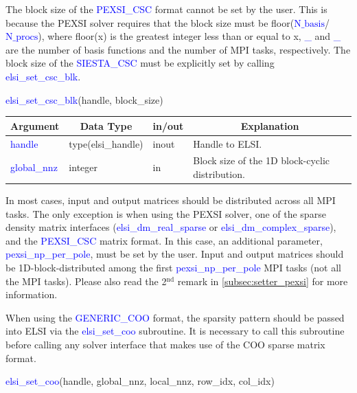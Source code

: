 \documentclass{report}
\begin{document}
The block size of the \textcolor{blue}{PEXSI\_CSC} format cannot be set by the user. This is because the PEXSI solver requires that the block size must be floor(\textcolor{blue}{$\text{N}\_\text{basis}$}/\textcolor{blue}{$\text{N}\_\text{procs}$}), where floor(x) is the greatest integer less than or equal to x, \textcolor{blue}{\_} and \textcolor{blue}{\_} are the number of basis functions and the number of MPI tasks, respectively. The block size of the \textcolor{blue}{SIESTA\_CSC} must be explicitly set by calling \textcolor{blue}{elsi\_set\_csc\_blk}.

\newpage
\begin{labeling}{\hspace{6cm}}
\item [\hspace{0.3cm} \textcolor{blue}{elsi\_set\_csc\_blk}(handle, block\_size)]
\end{labeling}

\begin{tabular}[]{|p{30mm}|p{30mm}|p{15mm}|p{90mm}|}
\hline
\multicolumn{1}{|c|}{\textbf{Argument}} & \multicolumn{1}{c|}{\textbf{Data Type}} & \multicolumn{1}{c|}{\textbf{in/out}} & \multicolumn{1}{c|}{\textbf{Explanation}}\\
\hline
\textcolor{blue}{handle}      & type(elsi\_handle) & inout & Handle to ELSI.\\
\hline
\textcolor{blue}{global\_nnz} & integer            & in    & Block size of the 1D block-cyclic distribution.\\
\hline
\end{tabular}

In most cases, input and output matrices should be distributed across all MPI tasks. The only exception is when using the PEXSI solver, one of the sparse density matrix interfaces (\textcolor{blue}{elsi\_dm\_real\_sparse} or \textcolor{blue}{elsi\_dm\_complex\_sparse}), and the \textcolor{blue}{PEXSI\_CSC} matrix format. In this case, an additional parameter, \textcolor{blue}{pexsi\_np\_per\_pole}, must be set by the user. Input and output matrices should be 1D-block-distributed among the first \textcolor{blue}{pexsi\_np\_per\_pole} MPI tasks (not all the MPI tasks). Please also read the 2$^\text{nd}$ remark in \ref{subsec:setter_pexsi} for more information.

When using the \textcolor{blue}{GENERIC\_COO} format, the sparsity pattern should be passed into ELSI via the \textcolor{blue}{elsi\_set\_coo} subroutine. It is necessary to call this subroutine before calling any solver interface that makes use of the COO sparse matrix format.
\begin{labeling}{\hspace{6cm}}
\item [\hspace{0.3cm} \textcolor{blue}{elsi\_set\_coo}(handle, global\_nnz, local\_nnz, row\_idx, col\_idx)]
\end{labeling}
\end{document}
